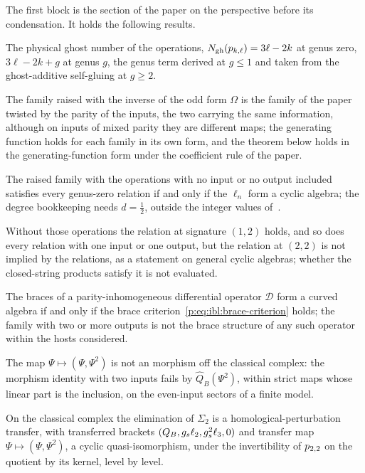 The first block is the section of the paper on the \IBL{} perspective before its condensation.
It holds the following results.

\noindent{} The physical ghost number of the operations, $N_{\text{gh}}(p_{k,\ell}) = 3 \ell - 2 k$ at genus zero, $3 \ell - 2 k + g$ at genus $g$, the genus term derived at $g \le 1$ and taken from the ghost-additive self-gluing at $g \ge 2$.

\noindent{} The family raised with the inverse of the odd form $\Omega$ is the family of the paper twisted by the parity of the inputs, the two carrying the same information, although on inputs of mixed parity they are different maps; the \IBL{} generating function holds for each family in its own form, and the theorem below holds in the generating-function form under the coefficient rule of the paper.

\noindent{} The raised family with the operations with no input or no output included satisfies every genus-zero \IBL{} relation if and only if the $\ell_n$ form a cyclic \Loo{} algebra; the degree bookkeeping needs $d = \tfrac{1}{2}$, outside the integer values of~\cite{Cieliebak:2015:HomologicalAlgebraRelated}.

\noindent{} Without those operations the relation at signature $(1, 2)$ holds, and so does every relation with one input or one output, but the relation at $(2, 2)$ is not implied by the \Loo{} relations, as a statement on general cyclic \Loo{} algebras; whether the closed-string products satisfy it is not evaluated.

\noindent{} The braces of a parity-inhomogeneous differential operator $\mathcal D$ form a curved \Loo{} algebra if and only if the brace criterion~\eqref{p:eq:ibl:brace-criterion} holds; the family with two or more outputs is not the brace structure of any such operator within the hosts considered.

\noindent{} The map $\Psi \mapsto (\Psi, \Psi^2)$ is not an \Loo{} morphism off the classical complex: the morphism identity with two inputs fails by $\hat{Q}_B (\Psi^2)$, within strict maps whose linear part is the inclusion, on the even-input sectors of a finite model.

\noindent{} On the classical complex the elimination of $\Sigma_2$ is a homological-perturbation transfer, with transferred brackets $(Q_B, g_s \ell_2, g_s^2 \ell_3, 0)$ and transfer map $\Psi \mapsto (\Psi, \Psi^2)$, a cyclic \Loo{} quasi-isomorphism, under the invertibility of $p_{2,2}$ on the quotient by its kernel, level by level.


